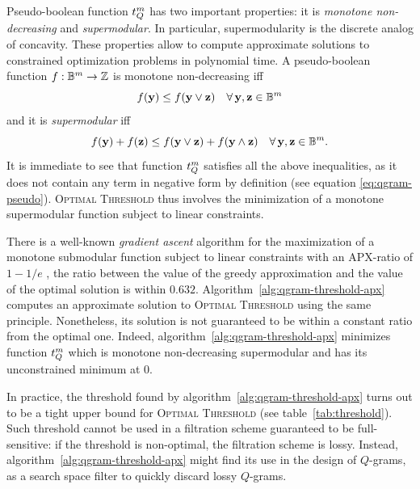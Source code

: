 Pseudo-boolean function $t_{Q}^{m}$ has two important properties: it is \emph{monotone non-decreasing} and \emph{supermodular}.
In particular, supermodularity is the discrete analog of concavity.
These properties allow to compute approximate solutions to constrained optimization problems in polynomial time.
A pseudo-boolean function $f : \mathbb{B}^{m} \rightarrow \mathbb{Z}$ is monotone non-decreasing iff 
\begin{equation}
\label{eq:monotone-non-decreasing}
f(\mathbf{y}) \leq f(\mathbf{y} \vee \mathbf{z}) \quad \forall \, \mathbf{y}, \mathbf{z} \in \mathbb{B}^{m}
\end{equation}
and it is \emph{supermodular} iff 
\begin{equation}
\label{eq:supermodularity}
f(\mathbf{y}) + f(\mathbf{z}) \leq f(\mathbf{y} \vee \mathbf{z}) + f(\mathbf{y} \wedge \mathbf{z}) \quad \forall \, \mathbf{y}, \mathbf{z} \in \mathbb{B}^{m}.
\end{equation}
It is immediate to see that function $t_{Q}^{m}$ satisfies all the above inequalities, as it does not contain any term in negative form by definition (see equation \ref{eq:qgram-pseudo}).
\textsc{Optimal Threshold} thus involves the minimization of a monotone supermodular function subject to linear constraints.

There is a well-known \emph{gradient ascent} algorithm for the maximization of a monotone submodular function subject to linear constraints with an APX-ratio of $1 - 1/e$ \citep{Nemhauser1978}, \ie the ratio between the value of the greedy approximation and the value of the optimal solution is within $0.632$.
Algorithm~\ref{alg:qgram-threshold-apx} computes an approximate solution to \textsc{Optimal Threshold} using the same principle.
Nonetheless, its solution is not guaranteed to be within a constant ratio from the optimal one.
Indeed, algorithm~\ref{alg:qgram-threshold-apx} minimizes function $t_{Q}^{m}$ which is monotone non-decreasing supermodular and has its unconstrained minimum at $0$.

In practice, the threshold found by algorithm~\ref{alg:qgram-threshold-apx} turns out to be a tight upper bound for \textsc{Optimal Threshold} (see table~\ref{tab:threshold}).
Such threshold cannot be used in a filtration scheme guaranteed to be full-sensitive: if the threshold is non-optimal, the filtration scheme is lossy.
Instead, algorithm~\ref{alg:qgram-threshold-apx} might find its use in the design of $Q$-grams, as a search space filter to quickly discard lossy $Q$-grams.

